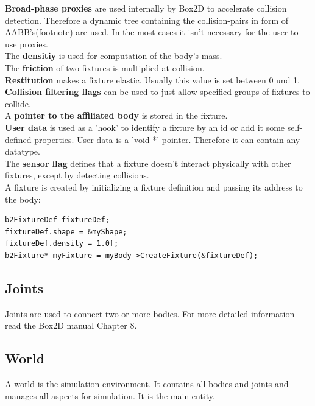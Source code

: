 \documentclass[10pt,a4paper,DIV=11]{scrreprt}
\begin{document}
\textbf{Broad-phase proxies} are used internally by Box2D to accelerate collision detection. Therefore a dynamic tree containing the collision-pairs in form of AABB's(footnote) are used. In the most cases it isn't necessary for the user to use proxies. \\

The \textbf{densitiy} is used for computation of the body's mass.\\

The \textbf{friction} of two fixtures is multiplied at collision. \\

\textbf{Restitution} makes a fixture elastic. Usually this value is set between 0 und 1. \\

\textbf{Collision filtering flags} can be used to just allow specified groups of fixtures to collide. \\

A \textbf{pointer to the affiliated body} is stored in the fixture.\\

\textbf{User data} is used as a 'hook' to identify a fixture by an id or add it some self-defined properties. User data is a 'void *'-pointer. Therefore it can contain any datatype. \\

The \textbf{sensor flag} defines that a fixture doesn't interact physically with other fixtures, except by detecting collisions. \\



A fixture is created by initializing a fixture definition and passing its address to the body:

\begin{lstlisting}[caption={Creation of a fixture (source Box2D manual)},label=lst:fixture-create]
b2FixtureDef fixtureDef;
fixtureDef.shape = &myShape;
fixtureDef.density = 1.0f;
b2Fixture* myFixture = myBody->CreateFixture(&fixtureDef);
\end{lstlisting}


\subsection{Joints}
Joints are used to connect two or more bodies. For more detailed information read the Box2D manual Chapter 8.

\subsection{World}
A world is the simulation-environment. It contains all bodies and joints and manages all aspects for simulation. It is the main entity.
\end{document}
